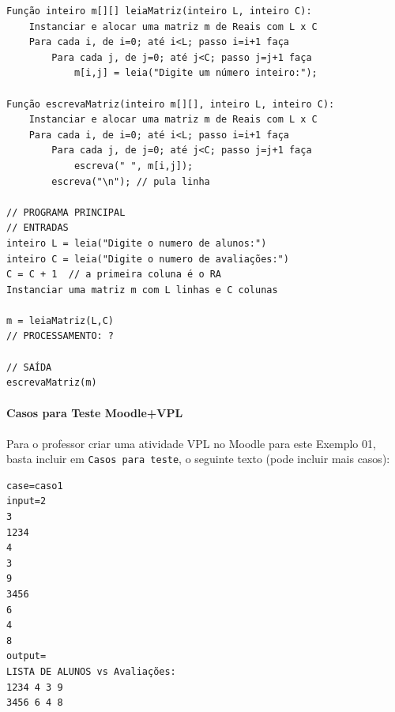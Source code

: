 \documentclass[12pt,a4paper]{article}
\begin{document}
    \begin{verbatim}
Função inteiro m[][] leiaMatriz(inteiro L, inteiro C):
    Instanciar e alocar uma matriz m de Reais com L x C
    Para cada i, de i=0; até i<L; passo i=i+1 faça
        Para cada j, de j=0; até j<C; passo j=j+1 faça
            m[i,j] = leia("Digite um número inteiro:");

Função escrevaMatriz(inteiro m[][], inteiro L, inteiro C): 
    Instanciar e alocar uma matriz m de Reais com L x C
    Para cada i, de i=0; até i<L; passo i=i+1 faça
        Para cada j, de j=0; até j<C; passo j=j+1 faça
            escreva(" ", m[i,j]);
        escreva("\n"); // pula linha

// PROGRAMA PRINCIPAL
// ENTRADAS
inteiro L = leia("Digite o numero de alunos:")
inteiro C = leia("Digite o numero de avaliações:")
C = C + 1  // a primeira coluna é o RA
Instanciar uma matriz m com L linhas e C colunas 

m = leiaMatriz(L,C)
// PROCESSAMENTO: ?

// SAÍDA
escrevaMatriz(m)
\end{verbatim}

    \hypertarget{casos-para-teste-moodlevpl}{%
\paragraph{Casos para Teste
Moodle+VPL}\label{casos-para-teste-moodlevpl}}

Para o professor criar uma atividade VPL no Moodle para este Exemplo 01,
basta incluir em \texttt{Casos\ para\ teste}, o seguinte texto (pode
incluir mais casos):

\begin{verbatim}
case=caso1
input=2
3
1234 
4 
3 
9
3456
6
4
8
output=
LISTA DE ALUNOS vs Avaliações:
1234 4 3 9
3456 6 4 8
\end{verbatim}
\end{document}
